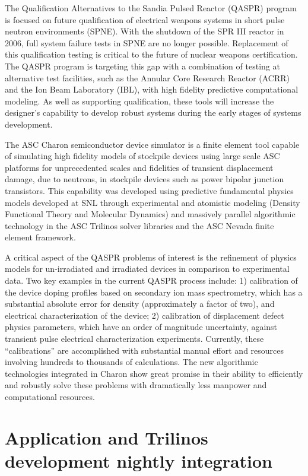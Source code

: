 \documentclass[pdf,ps2pdf,11pt]{SANDreport}
\begin{document}
The Qualification Alternatives to the Sandia Pulsed Reactor (QASPR) program is
focused on future qualification of electrical weapons systems in short pulse
neutron environments (SPNE).  With the shutdown of the SPR III reactor in
2006, full system failure tests in SPNE are no longer possible.  Replacement
of this qualification testing is critical to the future of nuclear weapons
certification.  The QASPR program is targeting this gap with a combination of
testing at alternative test facilities, such as the Annular Core Research
Reactor (ACRR) and the Ion Beam Laboratory (IBL), with high fidelity
predictive computational modeling.  As well as supporting qualification, these
tools will increase the designer's capability to develop robust systems during
the early stages of systems development.

The ASC Charon semiconductor device simulator is a finite element tool capable
of simulating high fidelity models of stockpile devices using large scale ASC
platforms for unprecedented scales and fidelities of transient displacement
damage, due to neutrons, in stockpile devices such as power bipolar junction
transistors.  This capability was developed using predictive fundamental
physics models developed at SNL through experimental and atomistic modeling
(Density Functional Theory and Molecular Dynamics) and massively parallel
algorithmic technology in the ASC Trilinos solver libraries and the ASC Nevada
finite element framework.

A critical aspect of the QASPR problems of interest is the refinement of
physics models for un-irradiated and irradiated devices in comparison to
experimental data.  Two key examples in the current QASPR process include: 1)
calibration of the device doping profiles based on secondary ion mass
spectrometry, which has a substantial absolute error for density
(approximately a factor of two), and electrical characterization of the device;
2) calibration of displacement defect physics parameters, which have an order
of magnitude uncertainty, against transient pulse electrical characterization
experiments.  Currently, these ``calibrations'' are accomplished with
substantial manual effort and resources involving hundreds to thousands of
calculations.  The new algorithmic technologies integrated in Charon show
great promise in their ability to efficiently and robustly solve these
problems with dramatically less manpower and computational resources.

%
\section{Application and Trilinos development nightly integration}
%
\end{document}
